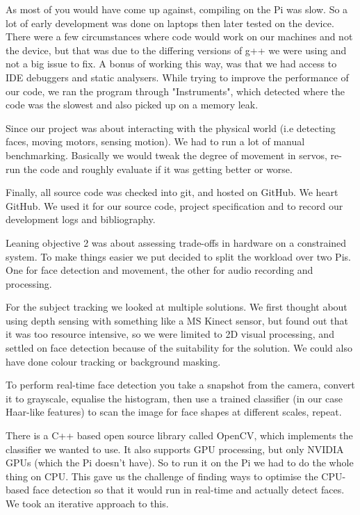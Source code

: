 \documentclass[11pt,a4paper,titlepage]{report}
\begin{document}
\begin{appendices}
As most of you would have come up against, compiling on the Pi was slow. So a lot of early development was done on laptops then later tested on the device. There were a few circumstances where code would work on our machines and not the device, but that was due to the differing versions of g++ we were using and not a big issue to fix. A bonus of working this way, was that we had access to IDE debuggers and static analysers. While trying to improve the performance of our code, we ran the program through "Instruments", which detected where the code was the slowest and also picked up on a memory leak. 

Since our project was about interacting with the physical world (i.e detecting faces, moving motors, sensing motion). We had to run a lot of manual benchmarking. Basically we would tweak the degree of movement in servos, re-run the code and roughly evaluate if it was getting better or worse.

Finally, all source code was checked into git, and hosted on GitHub. We heart GitHub. We used it for our source code, project specification and to record our development logs and bibliography.

Leaning objective 2 was about assessing trade-offs in hardware on a constrained system. To make things easier we put decided to split the workload over two Pis. One for face detection and movement, the other for audio recording and processing. 

For the subject tracking we looked at multiple solutions. We first thought about using depth sensing with something like a MS Kinect sensor, but found out that it was too resource intensive, so we were limited to 2D visual processing, and settled on face detection because of the suitability for the solution. We could also have done colour tracking or background masking.

To perform real-time face detection you take a snapshot from the camera, convert it to grayscale, equalise the histogram, then use a trained classifier (in our case Haar-like features) to scan the image for face shapes at different scales, repeat.

There is a C++ based open source library called OpenCV, which implements the classifier we wanted to use. It also supports GPU processing, but only NVIDIA GPUs (which the Pi doesn’t have). So to run it on the Pi we had to do the whole thing on CPU. This gave us the challenge of finding ways to optimise the CPU-based face detection so that it would run in real-time and actually detect faces. We took an iterative approach to this.


\end{appendices}
\end{document}
